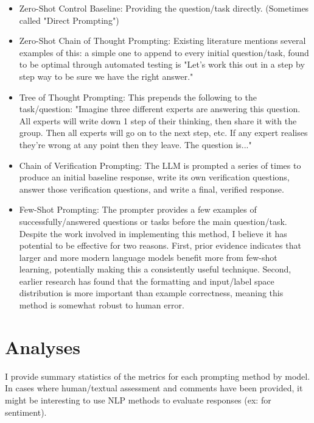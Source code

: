 \documentclass[11pt]{article}
\begin{document}
\begin{itemize}
  \item Zero-Shot Control Baseline: Providing the question/task directly. (Sometimes called "Direct Prompting")
  \item Zero-Shot Chain of Thought Prompting: Existing literature mentions several examples of this: a simple one to append to every initial question/task, found to be optimal through automated testing is "Let's work this out in a step by step way to be sure we have the right answer." \cite{hebenstreit_automatically_2023, zhou_large_2022}
  \item Tree of Thought Prompting: This prepends the following to the task/question: "Imagine three different experts are answering this question. All experts will write down 1 step of their thinking, then share it with the group. Then all experts will go on to the next step, etc. If any expert realises they're wrong at any point then they leave. The question is..." \cite{hulbert_using_2023}
  \item Chain of Verification Prompting: The LLM is prompted a series of times to produce an initial baseline response, write its own verification questions, answer those verification questions, and write a final, verified response. \cite{dhuliawala_chain--verification_2023}
  \item Few-Shot Prompting: The prompter provides a few examples of successfully/answered questions or tasks before the main question/task. Despite the work involved in implementing this method, I believe it has potential to be effective for two reasons. First, prior evidence indicates that larger and more modern language models benefit more from few-shot learning, potentially making this a consistently useful technique. \cite{brown_language_2020} Second, earlier research has found that the formatting and input/label space distribution is more important than example correctness, meaning this method is somewhat robust to human error. \cite{min_rethinking_2022}
\end{itemize}

\section*{Analyses}

I provide summary statistics of the metrics for each prompting method by model. In cases where human/textual assessment and comments have been provided, it might be interesting to use NLP methods to evaluate responses (ex: for sentiment).
\end{document}
